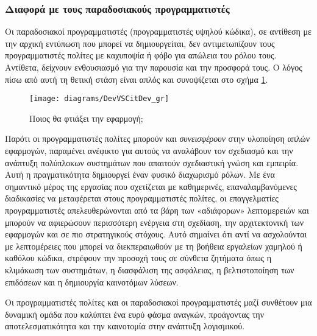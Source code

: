                 \subsubsection{Διαφορά με τους παραδοσιακούς προγραμματιστές}
                    Οι παραδοσιακοί προγραμματιστές (προγραμματιστές υψηλού κώδικα), σε αντίθεση με την αρχική εντύπωση που μπορεί να δημιουργείται, δεν αντιμετωπίζουν τους προγραμματιστές πολίτες με καχυποψία ή φόβο για απώλεια του ρόλου τους. Αντίθετα, δείχνουν ενθουσιασμό για την παρουσία και την προσφορά τους. Ο λόγος πίσω από αυτή τη θετική στάση είναι απλός και συνοψίζεται στο σχήμα \ref{fig:DevVSCitDev}.

                    \begin{figure}[h!] \noindent \centering
                            \texttt{[image: diagrams/DevVSCitDev\_gr]}
                            \caption{Ποιος θα φτιάξει την εφαρμογή; \cite{LowCodeSimon}}
                            \label{fig:DevVSCitDev}
                    \end{figure}

                    Παρότι οι προγραμματιστές πολίτες μπορούν και \textit{συνεισφέρουν} στην υλοποίηση απλών εφαρμογών, παραμένει ανέφικτο για αυτούς να αναλάβουν τον σχεδιασμό και την ανάπτυξη πολύπλοκων συστημάτων που απαιτούν σχεδιαστική γνώση και εμπειρία. Αυτή η πραγματικότητα δημιουργεί έναν φυσικό διαχωρισμό ρόλων. Με ένα σημαντικό μέρος της εργασίας που σχετίζεται με καθημερινές, επαναλαμβανόμενες διαδικασίες να μεταφέρεται στους προγραμματιστές πολίτες, οι επαγγελματίες προγραμματιστές απελευθερώνονται από τα βάρη των «αδιάφορων» λεπτομερειών και μπορούν να αφιερώσουν περισσότερη ενέργεια στη σχεδίαση, την αρχιτεκτονική των εφαρμογών και σε πιο στρατηγικούς στόχους. Αυτό σημαίνει ότι αντί να ασχολούνται με λεπτομέρειες που μπορεί να διεκπεραιωθούν με τη βοήθεια εργαλείων χαμηλού ή καθόλου κώδικα, στρέφουν την προσοχή τους σε σύνθετα ζητήματα όπως η κλιμάκωση των συστημάτων, η διασφάλιση της ασφάλειας, η βελτιστοποίηση των επιδόσεων και η δημιουργία καινοτόμων λύσεων. \cite{Sahay2020}

                    Οι προγραμματιστές πολίτες και οι παραδοσιακοί προγραμματιστές μαζί συνθέτουν μια δυναμική ομάδα που καλύπτει ένα ευρύ φάσμα αναγκών, προάγοντας την αποτελεσματικότητα και την καινοτομία στην ανάπτυξη λογισμικού.

